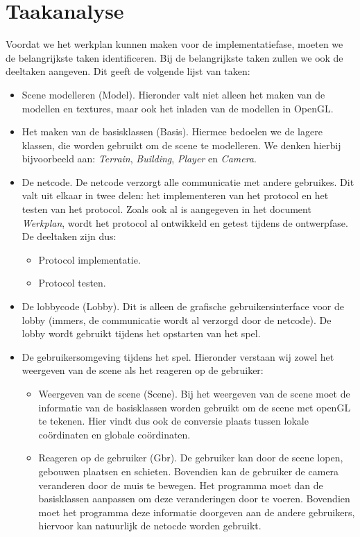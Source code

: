 \documentclass[a4paper,11pt]{article}
\begin{document}
	
	
	\tableofcontents
	\newpage
    
    \section{Taakanalyse}
    Voordat we het werkplan kunnen maken voor de implementatiefase, moeten we de belangrijkste taken identificeren. Bij de belangrijkste taken zullen we ook de deeltaken aangeven. Dit geeft de volgende lijst van taken:
    \begin{itemize}
    \item Scene modelleren (Model). Hieronder valt niet alleen het maken van de modellen en textures, maar ook het inladen van de modellen in OpenGL.
    \item Het maken van de basisklassen (Basis). Hiermee bedoelen we de lagere klassen, die worden gebruikt om de scene te modelleren. We denken hierbij bijvoorbeeld aan: \emph{Terrain}, \emph{Building}, \emph{Player} en \emph{Camera}.
    \item De netcode. De netcode verzorgt alle communicatie met andere gebruikes. Dit valt uit elkaar in twee delen: het implementeren van het protocol en het testen van het protocol. Zoals ook al is aangegeven in het document \emph{Werkplan}, wordt het protocol al ontwikkeld en getest tijdens de ontwerpfase. De deeltaken zijn dus:
        \begin{itemize}
        \item Protocol implementatie.
        \item Protocol testen.
        \end{itemize}
    \item De lobbycode (Lobby). Dit is alleen de grafische gebruikersinterface voor de lobby (immers, de communicatie wordt al verzorgd door de netcode). De lobby wordt gebruikt tijdens het opstarten van het spel.
    \item De gebruikersomgeving tijdens het spel. Hieronder verstaan wij zowel het weergeven van de scene als het reageren op de gebruiker:
        \begin{itemize}
        \item Weergeven van de scene (Scene). Bij het weergeven van de scene moet de informatie van de basisklassen worden gebruikt om de scene met openGL te tekenen. Hier vindt dus ook de conversie plaats tussen lokale co\"ordinaten en globale co\"ordinaten.
        \item Reageren op de gebruiker (Gbr). De gebruiker kan door de scene lopen, gebouwen plaatsen en schieten. Bovendien kan de gebruiker de camera veranderen door de muis te bewegen. Het programma moet dan de basisklassen aanpassen om deze veranderingen door te voeren. Bovendien moet het programma deze informatie doorgeven aan de andere gebruikers, hiervoor kan natuurlijk de netocde worden gebruikt.
        \end{itemize}
    \end{itemize}
 
\end{document}
